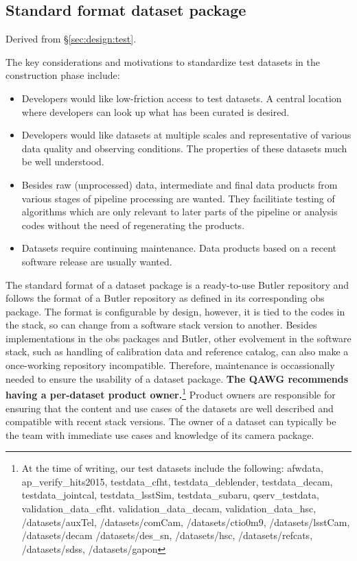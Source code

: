 \subsection{Standard format dataset package}
\label{sec:comp:dataset}

Derived from \S\ref{sec:design:test}.


The key considerations and motivations to standardize test datasets
in the construction phase include:

\begin{itemize}

\item{Developers would like low-friction access to test datasets.
A central location where developers can look up what has been curated
is desired.}

\item{Developers would like datasets at multiple scales and
representative of various data quality and observing conditions.
The properties of these datasets much be well understood.}

\item{Besides raw (unprocessed) data, intermediate and final data
products from various stages of pipeline processing are wanted.
They facilitiate testing of algorithms which are only relevant to
later parts of the pipeline or analysis codes without the need of
regenerating the products.}

\item{Datasets require continuing maintenance. Data products based
on a recent software release are usually wanted.}

\end{itemize}


The standard format of a dataset package is a ready-to-use Butler
repository and follows the format of a Butler repository as defined
in its corresponding obs package.  The format is configurable by
design, however, it is tied to the codes in the stack, so can change
from a software stack version to another.  Besides implementations
in the obs packages and Butler, other evolvement in the software
stack, such as handling of calibration data and reference catalog,
can also make a once-working repository incompatible.  Therefore,
maintenance is occassionally needed to ensure the usability of a
dataset package. \textbf{The QAWG recommends having a per-dataset product
owner.}\footnote{At the time of writing, our test datasets include
the following: afwdata, ap\_verify\_hits2015, testdata\_cfht,
testdata\_deblender, testdata\_decam, testdata\_jointcal,
testdata\_lsstSim, testdata\_subaru, qserv\_testdata,
validation\_data\_cfht.  validation\_data\_decam, validation\_data\_hsc,
/datasets/auxTel, /datasets/comCam, /datasets/ctio0m9, /datasets/lsstCam,
/datasets/decam /datasets/des\_sn, /datasets/hsc, /datasets/refcats,
/datasets/sdss, /datasets/gapon}
Product owners are responsible for ensuring that the content and
use cases of the datasets are well described and compatible with
recent stack versions.  The owner of a dataset can typically be the
team with immediate use cases and knowledge of its camera package.

